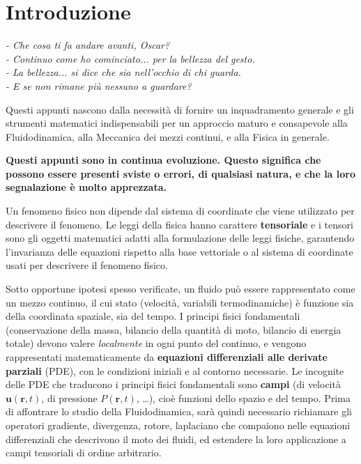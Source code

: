 \chapter*{Introduzione}
\vspace{-1.0cm}
\begin{flushright}
\textit{
- Che cosa ti fa andare avanti, Oscar? \\
- Continuo come ho cominciato... per la bellezza del gesto. \\
- La bellezza... si dice che sia nell'occhio di chi guarda. \\
- E se non rimane più nessuno a guardare?
}
\end{flushright}
\vspace{+1.0cm}
\minitoc

Questi appunti nascono dalla necessità di fornire un inquadramento generale e gli strumenti matematici indispensabili per un approccio maturo e consapevole alla Fluidodinamica, alla Meccanica dei mezzi continui, e alla Fisica in generale.
\vspace{0.5cm}

\textbf{
Questi appunti sono in continua evoluzione. Questo significa che possono essere presenti sviste o errori, di qualsiasi natura, e che la loro segnalazione è molto apprezzata.}
\vspace{0.5cm}

Un fenomeno fisico non dipende dal sistema di coordinate che viene utilizzato per descrivere il fenomeno. Le leggi della fisica hanno carattere \textbf{tensoriale} e i tensori sono gli oggetti matematici adatti alla formulazione delle leggi fisiche, garantendo l'invarianza delle equazioni rispetto alla base vettoriale o al sistema di coordinate usati per descrivere il fenomeno fisico.

Sotto opportune ipotesi spesso verificate, un fluido può essere rappresentato come un mezzo continuo, il cui stato (velocità, variabili termodinamiche) è funzione sia della coordinata spaziale, sia del tempo. I principi fisici fondamentali (conservazione della massa, bilancio della quantità di moto, bilancio di energia totale) devono valere \textit{localmente} in ogni punto del continuo, e vengono rappresentati matematicamente da \textbf{equazioni differenziali alle derivate parziali} (PDE), con le condizioni iniziali e al contorno necessarie. Le incognite delle PDE che traducono i principi fisici fondamentali sono \textbf{campi} (di velocità $\bm{u}(\bm{r},t)$, di pressione $P(\bm{r},t)$, \dots), cioè funzioni dello spazio e del tempo.
%
Prima di affontrare lo studio della Fluidodinamica, sarà quindi necessario richiamare gli operatori gradiente, divergenza, rotore, laplaciano che compaiono nelle equazioni differenziali che descrivono il moto dei fluidi, ed estendere la loro applicazione a campi tensoriali di ordine arbitrario.

